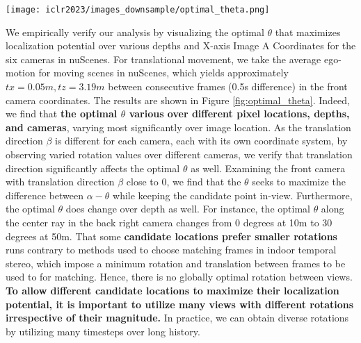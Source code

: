 \documentclass[runningheads, hyperfootnotes=false]{article}
\begin{document}
\begin{figure*}[t]
  \centering
  \texttt{[image: iclr2023/images\_downsample/optimal\_theta.png]}
  \captionsetup{aboveskip=0pt}\captionsetup{belowskip=0pt}
  \caption{We visualize the optimal theta for various candidate locations.}
  \label{fig:optimal_theta}
\end{figure*} 
We empirically verify our analysis by visualizing the optimal $\theta$ that maximizes localization potential over various depths and X-axis Image A Coordinates for the six cameras in nuScenes. For translational movement, we take the average ego-motion for moving scenes in nuScenes, which yields approximately $tx = 0.05m, tz = 3.19m$ between consecutive frames (0.5s difference) in the front camera coordinates. The results are shown in Figure \ref{fig:optimal_theta}. Indeed, we find that \textbf{the optimal $\theta$ various over different pixel locations, depths, and cameras}, varying most significantly over image location. As the translation direction $\beta$ is different for each camera, each with its own coordinate system, by observing varied rotation values over different cameras, we verify that translation direction significantly affects the optimal $\theta$ as well. Examining the front camera with translation direction $\beta$ close to 0, we find that the $\theta$ seeks to maximize the difference between $\alpha - \theta$ while keeping the candidate point in-view. Furthermore, the optimal $\theta$ does change over depth as well. For instance, the optimal $\theta$ along the center ray in the back right camera changes from 0 degrees at 10m to 30 degrees at 50m. That some \textbf{candidate locations prefer smaller rotations} runs contrary to methods used to choose matching frames in indoor temporal stereo, which impose a minimum rotation and translation \citep{Hou2019MultiViewSB,Sun2021NeuralReconRC} between frames to be used to for matching. Hence, there is no globally optimal rotation between views. \textbf{To allow different candidate locations to maximize their localization potential, it is important to utilize many views with different rotations irrespective of their magnitude.} In practice, we can obtain diverse rotations by utilizing many timesteps over long history.
\end{document}
